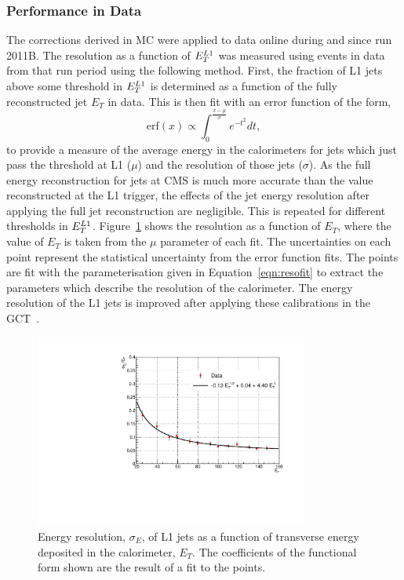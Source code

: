 \subsubsection{Performance in Data}
The corrections derived in MC were applied to data online during and since run 2011B.
The resolution as a function of $E_{T}^{L1}$ was measured using events in data from that run period
using the following method.
First, the fraction of L1 jets above some threshold in $E_{T}^{L1}$ is determined as a function 
of the fully reconstructed jet $E_{T}$ in data.  
This is then fit with an error function of the form, 
\begin{equation}
\mathrm{erf}(x)\propto \int_{0}^{\frac{x-\mu}{\sigma}} e^{-t^{2}}dt,
\end{equation}
to provide a measure of the average energy in the calorimeters 
for jets which just pass the threshold at L1 ($\mu$) and the resolution of those jets ($\sigma$). 
As the full energy reconstruction for jets at CMS is much
more accurate than the value reconstructed at the L1 trigger, the effects of the jet energy resolution
after applying the full jet reconstruction are negligible. This is repeated for different thresholds in $E_{T}^{L1}$.
Figure~\ref{fig:l1dataresolution} shows the resolution as a function
of $E_{T}$, where the value of $E_{T}$ is taken from the $\mu$ parameter of each fit. 
The uncertainties on each point represent the statistical uncertainty from the error function fits.
The points are fit with the parameterisation given in Equation~\ref{eqn:resofit} to extract the parameters which describe the
resolution of the calorimeter. The energy resolution of the L1 jets is improved after applying these 
calibrations in the GCT~\citep{l1triggernote}.

\begin{figure}
\begin{center}
\includegraphics[width=0.8\textwidth]{detector/l1jet/DataResolution.pdf}
\caption{Energy resolution, $\sigma_{E}$, of L1 jets as a function of transverse energy deposited in the
calorimeter, $E_{T}$. The coefficients of the functional form shown are the result of a fit to the points.}
\end{center}
\label{fig:l1dataresolution}
\end{figure}




